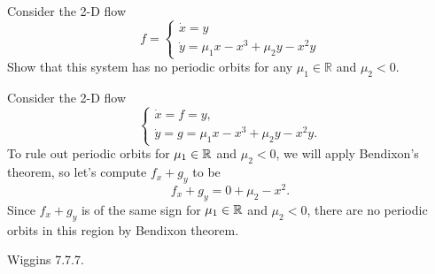 \documentclass[12pt]{report}
\begin{document}
\newpage



\begin{problem}
    Consider the 2-D flow
    \begin{equation*}
        f = \left\{\begin{array}{l}
        \dot x = y \\
        \dot y = \mu_1 x - x^3 + \mu_2 y - x^2 y  
        \end{array}\right.
    \end{equation*}
    Show that this system has no periodic orbits for any $\mu_1 \in \mathbb{R}$ and $\mu_2 < 0$.
\end{problem}

\begin{solution}
    
    \noindent
    Consider the 2-D flow
    \begin{equation*}
        \left\{\begin{array}{l}
        \dot x = f = y, \\
        \dot y = g = \mu_1 x - x^3 + \mu_2 y - x^2 y.  
        \end{array}\right.
    \end{equation*}
    To rule out periodic orbits for $\mu_1 \in {\mathbb R}$ and $\mu_2 <0$, we will apply Bendixon's theorem, so let's compute $f_x + g_y$ to be
    \[ 
        f_x + g_y = 0 + \mu_2 - x^2.
    \]
    Since $f_x + g_y$ is of the same sign for $\mu_1 \in {\mathbb R}$ and $\mu_2 < 0$, there are no periodic orbits in this region by Bendixon theorem. 


\end{solution}

\newpage



\begin{problem}
    Wiggins 7.7.7.
\end{problem}
\end{document}
